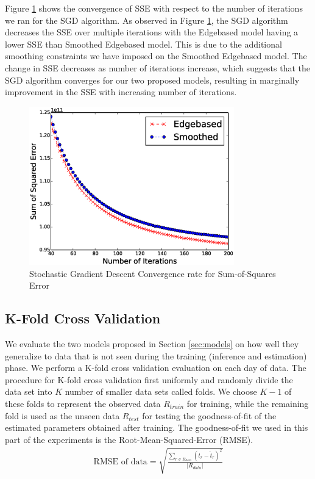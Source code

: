 \documentclass[conference]{IEEEtran.1.8}
\begin{document}
Figure \ref{fig:convergence} shows the convergence of SSE with respect to the number of iterations we ran for the SGD algorithm. %
As observed in Figure \ref{fig:convergence}, the SGD algorithm decreases the SSE over multiple iterations with the Edgebased model having a lower SSE than Smoothed Edgebased model. This is due to the additional smoothing constraints we have imposed on the Smoothed Edgebased model. The change in SSE decreases as number of iterations increase, which suggests that the SGD algorithm converges for our two proposed models, resulting in marginally improvement in the SSE with increasing number of iterations.
\begin{figure}[htb]
	\centering
	\includegraphics[width=3.5in]{convergence}
	\caption{Stochastic Gradient Descent Convergence rate for Sum-of-Squares Error}
	\label{fig:convergence}
\end{figure}

\subsection{K-Fold Cross Validation}

We evaluate the two models proposed in Section \ref{sec:models} on how well they generalize to data that is not seen during the training (inference and estimation) phase. We perform a K-fold cross validation evaluation on each day of data. The procedure for K-fold cross validation first uniformly and randomly divide the data set into $K$ number of smaller data sets called folds. We choose $K-1$ of these folds to represent the observed data $R_{train}$ for training, while the remaining fold is used as the unseen data $R_{test}$ for testing the goodness-of-fit of the estimated parameters obtained after training. The goodness-of-fit we used in this part of the experiments is the Root-Mean-Squared-Error (RMSE).
\begin{align*}
	\text{RMSE of data} = \sqrt{\frac{\sum_{r \in R_{data}} (t_r - \hat{t}_r)^2}{|R_{data}|}}
\end{align*}
\end{document}
